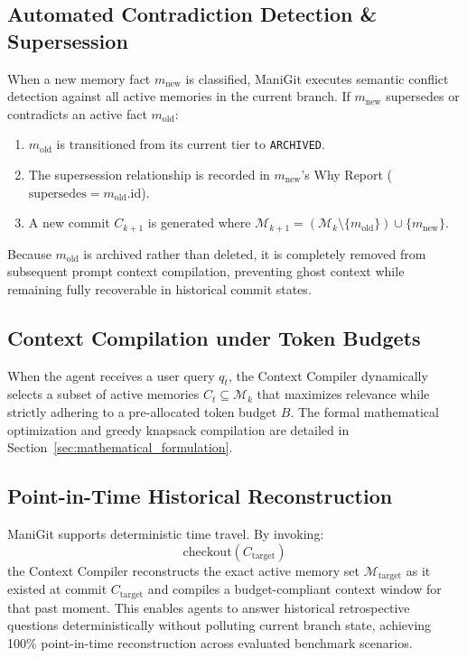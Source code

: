 \subsection{Automated Contradiction Detection & Supersession}
When a new memory fact $m_{\text{new}}$ is classified, ManiGit executes semantic conflict detection against all active memories in the current branch. If $m_{\text{new}}$ supersedes or contradicts an active fact $m_{\text{old}}$:
\begin{enumerate}
    \item $m_{\text{old}}$ is transitioned from its current tier to \texttt{ARCHIVED}.
    \item The supersession relationship is recorded in $m_{\text{new}}$'s Why Report ($\text{supersedes} = m_{\text{old}}.\text{id}$).
    \item A new commit $C_{k+1}$ is generated where $\mathcal{M}_{k+1} = (\mathcal{M}_k \setminus \{m_{\text{old}}\}) \cup \{m_{\text{new}}\}$.
\end{enumerate}
Because $m_{\text{old}}$ is archived rather than deleted, it is completely removed from subsequent prompt context compilation, preventing ghost context while remaining fully recoverable in historical commit states.

\subsection{Context Compilation under Token Budgets}
When the agent receives a user query $q_t$, the Context Compiler dynamically selects a subset of active memories $C_t \subseteq \mathcal{M}_k$ that maximizes relevance while strictly adhering to a pre-allocated token budget $B$. The formal mathematical optimization and greedy knapsack compilation are detailed in Section~\ref{sec:mathematical_formulation}.

\subsection{Point-in-Time Historical Reconstruction}
ManiGit supports deterministic time travel. By invoking:
$$\text{checkout}(C_{\text{target}})$$
the Context Compiler reconstructs the exact active memory set $\mathcal{M}_{\text{target}}$ as it existed at commit $C_{\text{target}}$ and compiles a budget-compliant context window for that past moment. This enables agents to answer historical retrospective questions deterministically without polluting current branch state, achieving 100\% point-in-time reconstruction across evaluated benchmark scenarios.
